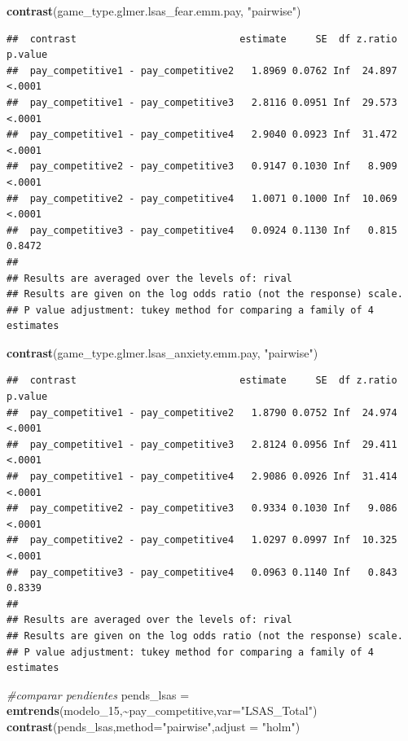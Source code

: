 \documentclass[
]{article}
\newenvironment{Shaded}{\begin{snugshade}}{\end{snugshade}}
\newcommand{\AttributeTok}[1]{\textcolor[rgb]{0.13,0.29,0.53}{#1}}
\newcommand{\CommentTok}[1]{\textcolor[rgb]{0.56,0.35,0.01}{\textit{#1}}}
\newcommand{\FunctionTok}[1]{\textcolor[rgb]{0.13,0.29,0.53}{\textbf{#1}}}
\newcommand{\NormalTok}[1]{#1}
\newcommand{\OtherTok}[1]{\textcolor[rgb]{0.56,0.35,0.01}{#1}}
\newcommand{\SpecialCharTok}[1]{\textcolor[rgb]{0.81,0.36,0.00}{\textbf{#1}}}
\newcommand{\StringTok}[1]{\textcolor[rgb]{0.31,0.60,0.02}{#1}}
\begin{document}
\begin{Shaded}
\begin{Highlighting}[]
\FunctionTok{contrast}\NormalTok{(game\_type.glmer.lsas\_fear.emm.pay, }\StringTok{"pairwise"}\NormalTok{)}
\end{Highlighting}
\end{Shaded}

\begin{verbatim}
##  contrast                            estimate     SE  df z.ratio p.value
##  pay_competitive1 - pay_competitive2   1.8969 0.0762 Inf  24.897  <.0001
##  pay_competitive1 - pay_competitive3   2.8116 0.0951 Inf  29.573  <.0001
##  pay_competitive1 - pay_competitive4   2.9040 0.0923 Inf  31.472  <.0001
##  pay_competitive2 - pay_competitive3   0.9147 0.1030 Inf   8.909  <.0001
##  pay_competitive2 - pay_competitive4   1.0071 0.1000 Inf  10.069  <.0001
##  pay_competitive3 - pay_competitive4   0.0924 0.1130 Inf   0.815  0.8472
## 
## Results are averaged over the levels of: rival 
## Results are given on the log odds ratio (not the response) scale. 
## P value adjustment: tukey method for comparing a family of 4 estimates
\end{verbatim}

\begin{Shaded}
\begin{Highlighting}[]
\FunctionTok{contrast}\NormalTok{(game\_type.glmer.lsas\_anxiety.emm.pay, }\StringTok{"pairwise"}\NormalTok{)}
\end{Highlighting}
\end{Shaded}

\begin{verbatim}
##  contrast                            estimate     SE  df z.ratio p.value
##  pay_competitive1 - pay_competitive2   1.8790 0.0752 Inf  24.974  <.0001
##  pay_competitive1 - pay_competitive3   2.8124 0.0956 Inf  29.411  <.0001
##  pay_competitive1 - pay_competitive4   2.9086 0.0926 Inf  31.414  <.0001
##  pay_competitive2 - pay_competitive3   0.9334 0.1030 Inf   9.086  <.0001
##  pay_competitive2 - pay_competitive4   1.0297 0.0997 Inf  10.325  <.0001
##  pay_competitive3 - pay_competitive4   0.0963 0.1140 Inf   0.843  0.8339
## 
## Results are averaged over the levels of: rival 
## Results are given on the log odds ratio (not the response) scale. 
## P value adjustment: tukey method for comparing a family of 4 estimates
\end{verbatim}

\begin{Shaded}
\begin{Highlighting}[]
\CommentTok{\#comparar pendientes}
\NormalTok{pends\_lsas }\OtherTok{=} \FunctionTok{emtrends}\NormalTok{(modelo\_15,}\SpecialCharTok{\textasciitilde{}}\NormalTok{pay\_competitive,}\AttributeTok{var=}\StringTok{"LSAS\_Total"}\NormalTok{)}
\FunctionTok{contrast}\NormalTok{(pends\_lsas,}\AttributeTok{method=}\StringTok{"pairwise"}\NormalTok{,}\AttributeTok{adjust =} \StringTok{"holm"}\NormalTok{)}
\end{Highlighting}
\end{Shaded}
\end{document}
